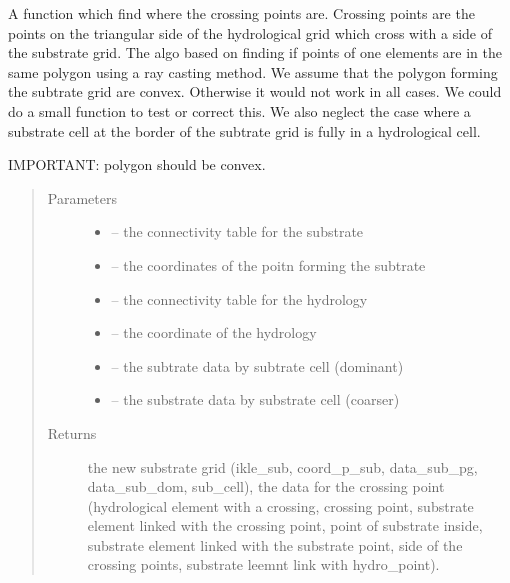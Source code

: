 \documentclass[letterpaper,10pt,english]{sphinxmanual}
\begin{document}
\begin{fulllineitems}
\label{\detokenize{index:src.mesh_grid2.find_sub_and_cross}}
A function which find where the crossing points are. Crossing points are the points on the triangular side of the
hydrological grid which cross with a side of the substrate grid. The algo based on finding if points of one elements
are in the same polygon using a ray casting method. We assume that the polygon forming the subtrate grid are convex.
Otherwise it would not work in all cases. We could do a small function to test or correct this.
We also neglect the case where a substrate cell at the border of the subtrate grid is fully in a hydrological cell.

IMPORTANT: polygon should be convex.
\begin{quote}\begin{description}
\item[{Parameters}] \leavevmode\begin{itemize}
\item {} 
 -- the connectivity table for the substrate

\item {} 
 -- the coordinates of the poitn forming the subtrate

\item {} 
 -- the connectivity table for the hydrology

\item {} 
 -- the coordinate of the hydrology

\item {} 
 -- the subtrate data by subtrate cell (dominant)

\item {} 
 -- the substrate data by substrate cell (coarser)

\end{itemize}

\item[{Returns}] \leavevmode
the new substrate grid (ikle\_sub, coord\_p\_sub, data\_sub\_pg, data\_sub\_dom, sub\_cell), the data for
the crossing point (hydrological element with a crossing, crossing point, substrate element linked with
the crossing point, point of substrate inside, substrate element linked with the substrate point,
side of the crossing points, substrate leemnt link with hydro\_point).

\end{description}\end{quote}

\end{fulllineitems}
\end{document}
